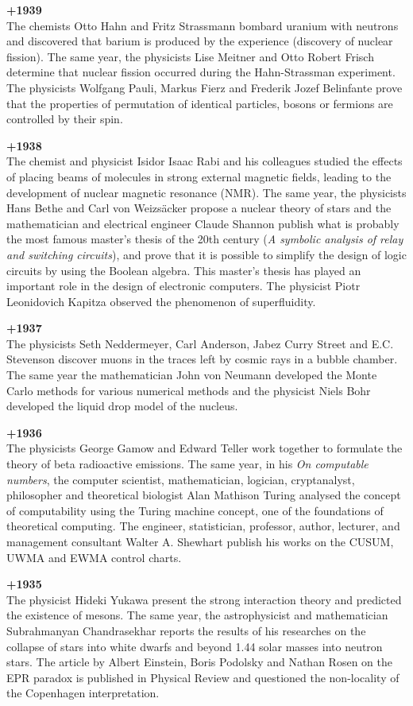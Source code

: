 \textbf{+1939}\\
The chemists Otto Hahn and Fritz Strassmann bombard uranium with neutrons and discovered that barium is produced by the experience (discovery of nuclear fission). The same year, the physicists Lise Meitner and Otto Robert Frisch determine that nuclear fission occurred during the Hahn-Strassman experiment. The physicists Wolfgang Pauli, Markus Fierz and Frederik Jozef Belinfante prove that the properties of permutation of identical particles, bosons or fermions are controlled by their spin.

\textbf{+1938}\\
The chemist and physicist Isidor Isaac Rabi and his colleagues studied the effects of placing beams of molecules in strong external magnetic fields, leading to the development of nuclear magnetic resonance (NMR). The same year, the physicists Hans Bethe and Carl von Weizsäcker propose a nuclear theory of stars and the mathematician and electrical engineer Claude Shannon publish what is probably the most famous master's thesis of the 20th century (\textit{A symbolic analysis of relay and switching circuits}), and prove that it is possible to simplify the design of logic circuits by using the Boolean algebra. This master's thesis has played an important role in the design of electronic computers. The physicist Piotr Leonidovich Kapitza observed the phenomenon of superfluidity.

\textbf{+1937}\\
The physicists Seth Neddermeyer, Carl Anderson, Jabez Curry Street and E.C. Stevenson discover muons in the traces left by cosmic rays in a bubble chamber. The same year the mathematician John von Neumann developed the Monte Carlo methods for various numerical methods and the physicist Niels Bohr developed the liquid drop model of the nucleus.

\textbf{+1936}\\
The physicists George Gamow and Edward Teller work together to formulate the theory of beta radioactive emissions. The same year, in his \textit{On computable numbers}, the computer scientist, mathematician, logician, cryptanalyst, philosopher and theoretical biologist Alan Mathison Turing analysed the concept of computability using the Turing machine concept, one of the foundations of theoretical computing. The engineer, statistician, professor, author, lecturer, and management consultant Walter A. Shewhart publish his works on the CUSUM, UWMA and EWMA control charts.

\textbf{+1935}\\
The physicist Hideki Yukawa present the strong interaction theory and predicted the existence of mesons. The same year, the astrophysicist and mathematician Subrahmanyan Chandrasekhar reports the results of his researches on the collapse of stars into white dwarfs and beyond 1.44 solar masses into neutron stars. The article by Albert Einstein, Boris Podolsky and Nathan Rosen on the EPR paradox is published in Physical Review and questioned the non-locality of the Copenhagen interpretation.


